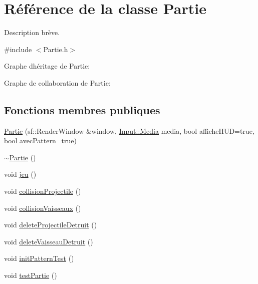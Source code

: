 \hypertarget{class_partie}{}\section{Référence de la classe Partie}
\label{class_partie}


Description brève.  




{\ttfamily \#include $<$Partie.\+h$>$}



Graphe d\textquotesingle{}héritage de Partie\+:


Graphe de collaboration de Partie\+:
\subsection*{Fonctions membres publiques}
\begin{DoxyCompactItemize}
\item 
\hyperlink{class_partie_a480ca8b79b54d01f4d1f1722f6c42935}{Partie} (sf\+::\+Render\+Window \&window, \hyperlink{class_input__base_a455585e7933485981b3d7bfcad3a47c6}{Input\+::\+Media} media, bool affiche\+H\+UD=true, bool avec\+Pattern=true)
\item 
\hyperlink{class_partie_ae4afeb7336bb84427272cfb7018b5e3d}{$\sim$\+Partie} ()
\item 
void \hyperlink{class_partie_a38d54358098b3e5e47d0059a37bff5ea}{jeu} ()
\item 
void \hyperlink{class_partie_a2ed02302df62c0867ebec0fc83078da3}{collision\+Projectile} ()
\item 
void \hyperlink{class_partie_a97ce349fac7e91f3cd8cc2a547a35239}{collision\+Vaisseaux} ()
\item 
void \hyperlink{class_partie_a88b2fa21d16b97fc120ea4d0e35208af}{delete\+Projectile\+Detruit} ()
\item 
void \hyperlink{class_partie_ae3caf4ac1e50ac945783b1a0d79a85c7}{delete\+Vaisseau\+Detruit} ()
\item 
void \hyperlink{class_partie_a3a0c4920ea230fb971f278a1b22d87a9}{init\+Pattern\+Test} ()
\item 
void \hyperlink{class_partie_a74a29a9840bdcb69acdd225acd6b336c}{test\+Partie} ()
\end{DoxyCompactItemize}
